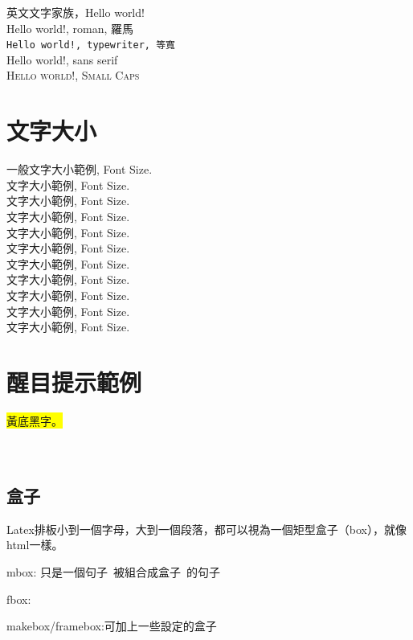 英文文字家族，Hello world!\\
{\LARGE
\textrm{Hello world!, roman, 羅馬} \\
\texttt{Hello world!, typewriter, 等寬} \\
\textsf{Hello world!, sans serif} \\
\textsc{Hello world!, Small Caps} \\
}

\section{文字大小}
一般文字大小範例, Font Size.\\
{\tiny 文字大小範例, Font Size.}\\
{\scriptsize 文字大小範例, Font Size.}\\
{\footnotesize 文字大小範例, Font Size.}\\
{\small 文字大小範例, Font Size.}\\
{\normalsize 文字大小範例, Font Size.}\\
{\large 文字大小範例, Font Size.}\\
{\Large 文字大小範例, Font Size.}\\
{\LARGE 文字大小範例, Font Size.}\\
{\huge 文字大小範例, Font Size.} \\
{\Huge 文字大小範例, Font Size.}
\clearpage

\section{醒目提示範例}
\colorbox{yellow}{黃底黑字。} \\
\color{blue}{青い文字} \\
 \\
\color{black}{最後請記得回復成預設黑色字體}

\subsection{盒子}
Latex排板小到一個字母，大到一個段落，都可以視為一個矩型盒子（box），就像html一樣。

mbox:
\mbox{只是一個句子 被組合成盒子 的句子}

fbox:

makebox/framebox:可加上一些設定的盒子



\newpage

